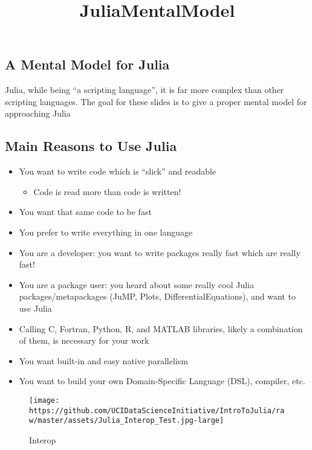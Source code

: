 \documentclass[11pt]{article}
\title{JuliaMentalModel}
\makeatletter
\def\maxwidth{\ifdim\Gin@nat@width>\linewidth\linewidth
    \else\Gin@nat@width\fi}
\let\Oldincludegraphics\includegraphics
\renewcommand{\includegraphics}[1]{\Oldincludegraphics[width=.8\maxwidth]{#1}}
\providecommand{\tightlist}{%
      \setlength{\itemsep}{0pt}\setlength{\parskip}{0pt}}
\makeatother
\begin{document}
    
    
    \maketitle
    
    

    
    \hypertarget{a-mental-model-for-julia}{%
\subsection{A Mental Model for Julia}\label{a-mental-model-for-julia}}

Julia, while being ``a scripting language'', it is far more complex than
other scripting languages. The goal for these slides is to give a proper
mental model for approaching Julia

    \hypertarget{main-reasons-to-use-julia}{%
\subsection{Main Reasons to Use Julia}\label{main-reasons-to-use-julia}}

\begin{itemize}
\tightlist
\item
  You want to write code which is ``slick'' and readable

  \begin{itemize}
  \tightlist
  \item
    Code is read more than code is written!
  \end{itemize}
\item
  You want that same code to be fast
\item
  You prefer to write everything in one language
\item
  You are a developer: you want to write packages really fast which are
  really fast!
\item
  You are a package user: you heard about some really cool Julia
  packages/metapackages (JuMP, Plots, DifferentialEquations), and want
  to use Julia
\item
  Calling C, Fortran, Python, R, and MATLAB libraries, likely a
  combination of them, is necessary for your work
\item
  You want built-in and easy native parallelism
\item
  You want to build your own Domain-Specific Language (DSL), compiler,
  etc.
\end{itemize}

    \begin{figure}
\centering
\texttt{[image: https://github.com/UCIDataScienceInitiative/IntroToJulia/raw/master/assets/Julia\_Interop\_Test.jpg-large]}
\caption{Interop}
\end{figure}
\end{document}
